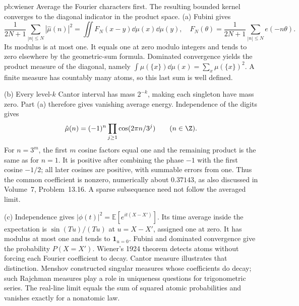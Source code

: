 \begin{solution}{pb:wiener}
\idea Average the Fourier characters first. The resulting bounded kernel converges to the diagonal indicator in the product space.
\writeup (a) Fubini gives
\[\frac1{2N+1}\sum_{|n|\le N}|\hat\mu(n)|^2
 =\iint F_N(x-y)\dd\mu(x)\dd\mu(y),\quad
F_N(\theta)=\frac1{2N+1}\sum_{|n|\le N}e(-n\theta).
\]
Its modulus is at most one. It equals one at zero modulo integers and tends to zero elsewhere by the geometric-sum formula. Dominated convergence yields the product measure of the diagonal, namely $\int\mu(\{x\})\dd\mu(x)=\sum_x\mu(\{x\})^2$. A finite measure has countably many atoms, so this last sum is well defined.

(b) Every level-$k$ Cantor interval has mass $2^{-k}$, making each singleton have mass zero. Part (a) therefore gives vanishing average energy. Independence of the digits gives
\[\hat\mu(n)=(-1)^n\prod_{j\ge1}\cos(2\pi n/3^j)\qquad(n\in\Z).
\]
For $n=3^m$, the first $m$ cosine factors equal one and the remaining product is the same as for $n=1$. It is positive after combining the phase $-1$ with the first cosine $-1/2$; all later cosines are positive, with summable errors from one. Thus the common coefficient is nonzero, numerically about $0.37143$, as also discussed in Volume~7, Problem~13.16. A sparse subsequence need not follow the averaged limit.

(c) Independence gives $|\phi(t)|^2=\mathbb E[e^{it(X-X')}]$. Its time average inside the expectation is $\sin(Tu)/(Tu)$ at $u=X-X'$, assigned one at zero. It has modulus at most one and tends to $\mathbf1_{u=0}$. Fubini and dominated convergence give the probability $P(X=X')$.
\leads Wiener's 1924 theorem detects atoms without forcing each Fourier coefficient to decay. Cantor measure illustrates that distinction. Menshov constructed singular measures whose coefficients do decay; such Rajchman measures play a role in uniqueness questions for trigonometric series. The real-line limit equals the sum of squared atomic probabilities and vanishes exactly for a nonatomic law.
\end{solution}

